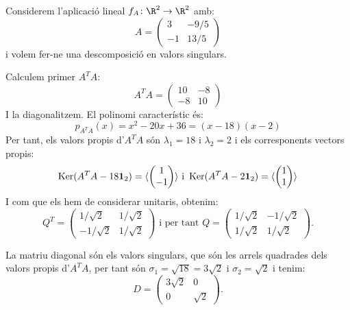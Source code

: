 \begin{exemple}
Considerem l'aplicació lineal $f_A\colon \R^2 \to \R^2$ amb:
\[
A=\begin{pmatrix}
3 & -9/5 \\ -1 & 13/5
\end{pmatrix}
\]
i volem fer-ne una descomposició en valors singulars.

Calculem primer $A^TA$:
\[
A^T A = \begin{pmatrix}
10 & -8 \\ -8 & 10
\end{pmatrix}
\]
I la diagonalitzem. El polinomi característic és:
\[
p_{A^TA}(x)=x^2 - 20 x + 36 = (x-18)(x-2)
\]
Per tant, els valors propis d'$A^TA$ són $\lambda_1=18$ i $\lambda_2=2$ i els corresponents vectors propis:
\[
\operatorname{Ker}(A^TA-18\mathbf{1}_2)=\langle \begin{pmatrix} 1 \\ -1 \end{pmatrix} \rangle \text{ i }
\operatorname{Ker}(A^TA-2\mathbf{1}_2)=\langle \begin{pmatrix} 1 \\ 1 \end{pmatrix} \rangle
\]
I com que els hem de considerar unitaris, obtenim:
\[
Q^T=\begin{pmatrix}
1/\sqrt{2} & 1/\sqrt{2} \\ -1/\sqrt{2} & 1/\sqrt{2}
\end{pmatrix}
\text{ i per tant }
Q=\begin{pmatrix}
1/\sqrt{2} & -1/\sqrt{2} \\ 1/\sqrt{2} & 1/\sqrt{2}
\end{pmatrix}.
\]

La matriu diagonal són els valors singulars, que són les arrels quadrades dels valors propis d'$A^TA$, per tant són $\sigma_1=\sqrt{18}=3\sqrt{2}$ i $\sigma_2=\sqrt{2}$ i tenim:
\[
D=\begin{pmatrix}
3\sqrt{2} & 0 \\ 0 & \sqrt{2}
\end{pmatrix}.
\]


\end{exemple}
